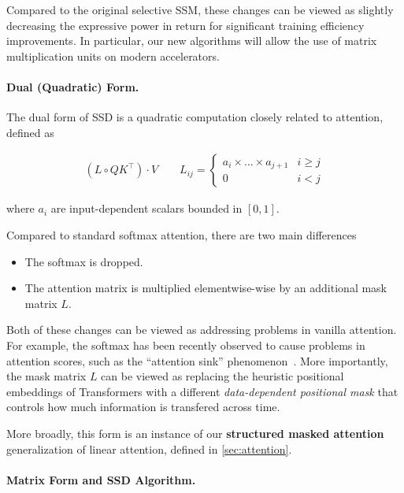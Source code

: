 Compared to the original selective SSM, these changes can be viewed as slightly decreasing the expressive power in return for significant training efficiency improvements. In particular, our new algorithms will allow the use of matrix multiplication units on modern accelerators.

\paragraph{Dual (Quadratic) Form.}

The dual form of SSD is a quadratic computation closely related to attention, defined as

\begin{align*}
  (L \circ QK^{\top}) \cdot V \qquad
  L_{ij} = \begin{cases}
    a_i \times \dots \times a_{j+1} & i \ge j \\
    0 & i < j
  \end{cases}
\end{align*}

where $a_i$ are input-dependent scalars bounded in $[0, 1]$.

Compared to standard softmax attention, there are two main differences

\begin{itemize}
  \item The softmax is dropped.
  \item The attention matrix is multiplied elementwise-wise by an additional mask matrix $L$.
\end{itemize}

Both of these changes can be viewed as addressing problems in vanilla attention. For example, the softmax has been recently observed to cause problems in attention scores, such as the ``attention sink'' phenomenon~\citep{xiao2024efficient,darcet2024vision}.
More importantly, the mask matrix $L$ can be viewed as replacing the heuristic positional embeddings of Transformers with a different \emph{data-dependent positional mask} that controls how much information is transfered across time.

More broadly, this form is an instance of our \textbf{structured masked attention} generalization of linear attention, defined in \ref{sec:attention}.

\paragraph{Matrix Form and SSD Algorithm.}

